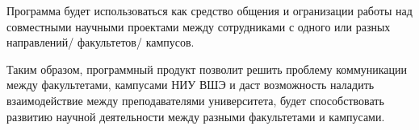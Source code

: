 
Программа будет использоваться как средство общения и огранизации работы над совместными научными проектами между сотрудниками с одного или разных направлений/ факультетов/ кампусов. 


Таким образом, программный продукт позволит решить проблему коммуникации между факультетами, кампусами НИУ ВШЭ и даст возможность наладить взаимодействие между преподавателями университета, будет способствовать развитию научной деятельности между разными факультетами и кампусами.